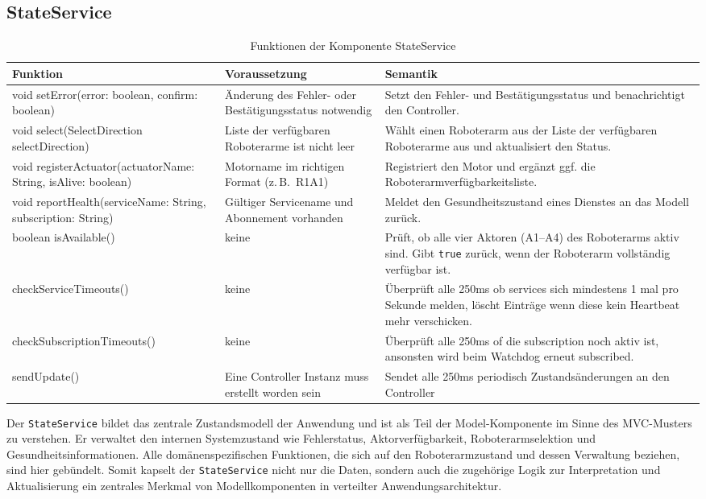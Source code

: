 \subsection{StateService}
\begin{table}[h!]
    \centering
    \begin{tabular}{|p{5cm}|p{5cm}|p{5cm}|}
        \hline
        \textbf{Funktion} & \textbf{Voraussetzung} & \textbf{Semantik} \\
        \hline
        void setError(error: boolean, confirm: boolean) & Änderung des Fehler- oder Bestätigungsstatus notwendig & Setzt den Fehler- und Bestätigungsstatus und benachrichtigt den Controller. \\
        \hline
        void select(SelectDirection selectDirection) & Liste der verfügbaren Roboterarme ist nicht leer & Wählt einen Roboterarm aus der Liste der verfügbaren Roboterarme aus und aktualisiert den Status. \\
        \hline
        void registerActuator(actuatorName: String, isAlive: boolean) & Motorname im richtigen Format (z.\,B.\ R1A1) & Registriert den Motor und ergänzt ggf. die Roboterarmverfügbarkeitsliste. \\
        \hline
        void reportHealth(serviceName: String, subscription: String) & Gültiger Servicename und Abonnement vorhanden & Meldet den Gesundheitszustand eines Dienstes an das Modell zurück. \\
        \hline
        boolean isAvailable() & keine & Prüft, ob alle vier Aktoren (A1–A4) des Roboterarms aktiv sind. Gibt \texttt{true} zurück, wenn der Roboterarm vollständig verfügbar ist. \\
        \hline
        checkServiceTimeouts() & keine & Überprüft alle 250ms ob services sich mindestens 1 mal pro Sekunde melden, löscht Einträge wenn diese kein Heartbeat mehr verschicken.\\
        \hline
        checkSubscriptionTimeouts() & keine & Überprüft alle 250ms of die subscription noch aktiv ist, ansonsten wird beim Watchdog erneut subscribed. \\
        \hline
        sendUpdate() & Eine Controller Instanz muss erstellt worden sein & Sendet alle 250ms periodisch Zustandsänderungen an den Controller
      


    \end{tabular}
    \caption{Funktionen der Komponente StateService}
    \label{tab:StateService}
\end{table}
\clearpage
Der \texttt{StateService} bildet das zentrale Zustandsmodell der Anwendung und ist als Teil der Model-Komponente im Sinne des MVC-Musters zu verstehen. 
Er verwaltet den internen Systemzustand wie Fehlerstatus, Aktorverfügbarkeit, Roboterarmselektion und Gesundheitsinformationen. 
Alle domänenspezifischen Funktionen, die sich auf den Roboterarmzustand und dessen Verwaltung beziehen, sind hier gebündelt. 
Somit kapselt der \texttt{StateService} nicht nur die Daten, sondern auch die zugehörige Logik zur Interpretation und Aktualisierung ein zentrales Merkmal von Modellkomponenten in verteilter Anwendungsarchitektur.



